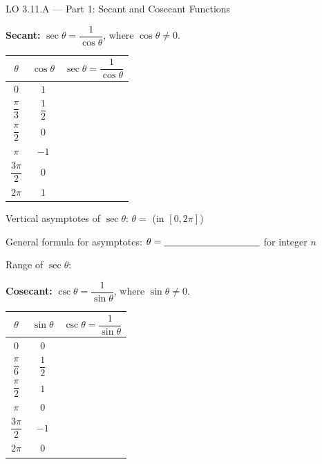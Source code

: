 \documentclass[10pt]{article}
\begin{document}
\begin{notesbox}{LO 3.11.A --- Part 1: Secant and Cosecant Functions}

\textbf{Secant:} $\sec\theta = \dfrac{1}{\cos\theta}$, where $\cos\theta \neq 0$.

\vspace{6pt}
\renewcommand{\arraystretch}{1.7}
\begin{tabular}{|c|c|c|}
\hline
$\theta$ & $\cos\theta$ & $\sec\theta = \dfrac{1}{\cos\theta}$ \\
\hline
$0$ & $1$ & \\
\hline
$\dfrac{\pi}{3}$ & $\dfrac{1}{2}$ & \\
\hline
$\dfrac{\pi}{2}$ & $0$ & \\
\hline
$\pi$ & $-1$ & \\
\hline
$\dfrac{3\pi}{2}$ & $0$ & \\
\hline
$2\pi$ & $1$ & \\
\hline
\end{tabular}

\vspace{6pt}
Vertical asymptotes of $\sec\theta$: $\theta = $ \underline{\hspace{4cm}} (in $[0,2\pi]$)

\vspace{4pt}
General formula for asymptotes: $\theta = \underline{\hspace{3.5cm}}$ for integer $n$

\vspace{4pt}
Range of $\sec\theta$: \underline{\hspace{5cm}}

\vspace{10pt}
\textbf{Cosecant:} $\csc\theta = \dfrac{1}{\sin\theta}$, where $\sin\theta \neq 0$.

\vspace{6pt}
\begin{tabular}{|c|c|c|}
\hline
$\theta$ & $\sin\theta$ & $\csc\theta = \dfrac{1}{\sin\theta}$ \\
\hline
$0$ & $0$ & \\
\hline
$\dfrac{\pi}{6}$ & $\dfrac{1}{2}$ & \\
\hline
$\dfrac{\pi}{2}$ & $1$ & \\
\hline
$\pi$ & $0$ & \\
\hline
$\dfrac{3\pi}{2}$ & $-1$ & \\
\hline
$2\pi$ & $0$ & \\
\hline
\end{tabular}


\end{notesbox}
\end{document}
